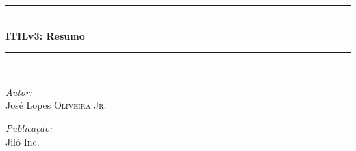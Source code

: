 %
%
%
%


\begin{titlepage}
\begin{center}
\vspace*{5cm}
\rule{\linewidth}{.5mm}\\[.4cm]
{\huge \bfseries ITIL\textsuperscript{\textregistered}v3: Resumo}\\[.4cm]
\rule{\linewidth}{.5mm}\\[1.5cm]

\begin{minipage}{.4\linewidth}
    \begin{flushleft}
        \large
        \emph{Autor:}\\
        José Lopes \textsc{Oliveira Jr.}
    \end{flushleft}
\end{minipage}
\begin{minipage}{.4\linewidth}
    \begin{flushright}
        \large
        \emph{Publicação:}\\
        Jiló Inc.
    \end{flushright}
\end{minipage}
\end{center}
\end{titlepage}
